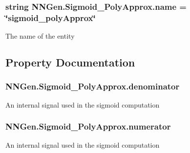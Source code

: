 \subsubsection[{name}]{\setlength{\rightskip}{0pt plus 5cm}string N\+N\+Gen.\+Sigmoid\+\_\+\+Poly\+Approx.\+name = \char`\"{}sigmoid\+\_\+poly\+Approx\char`\"{}}\label{class_n_n_gen_1_1_sigmoid___poly_approx_ae95905d2d05007afee1e105e93c64045}


The name of the entity 



\subsection{Property Documentation}
\hypertarget{class_n_n_gen_1_1_sigmoid___poly_approx_a371e8a19a69ffabafa7f6e2819b3c5b6}{}
\subsubsection[{denominator}]{ N\+N\+Gen.\+Sigmoid\+\_\+\+Poly\+Approx.\+denominator\hspace{0.3cm}{\ttfamily [get]}}\label{class_n_n_gen_1_1_sigmoid___poly_approx_a371e8a19a69ffabafa7f6e2819b3c5b6}


An internal signal used in the sigmoid computation 

\hypertarget{class_n_n_gen_1_1_sigmoid___poly_approx_a14047a901c8101e599e807f4ef07d46d}{}
\subsubsection[{numerator}]{ N\+N\+Gen.\+Sigmoid\+\_\+\+Poly\+Approx.\+numerator\hspace{0.3cm}{\ttfamily [get]}}\label{class_n_n_gen_1_1_sigmoid___poly_approx_a14047a901c8101e599e807f4ef07d46d}


An internal signal used in the sigmoid computation 

\hypertarget{class_n_n_gen_1_1_sigmoid___poly_approx_a3834aa67d528e6f7b4698d651a28d027}{}
